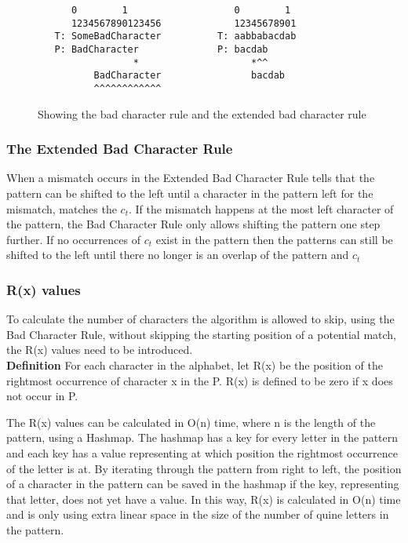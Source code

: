 \begin{figure}
\begin{verbatim}
      0        1                   0        1      
      1234567890123456             12345678901
   T: SomeBadCharacter          T: aabbabacdab
   P: BadCharacter              P: bacdab          
                 *                    *^^
          BadCharacter                bacdab
          ^^^^^^^^^^^^                
\end{verbatim}
    \caption{Showing the bad character rule and the extended bad character rule}
    \label{fig:badcharacterrule_example}
\end{figure}

\subsubsection{The Extended Bad Character Rule}
When a mismatch occurs in the Extended Bad Character Rule tells that the pattern can be shifted to the left until a character in the pattern left for the mismatch, matches the $c_t$. If the mismatch happens at the most left character of the pattern, the Bad Character Rule only allows shifting the pattern one step further.  If no occurrences of $c_t$ exist in the pattern then the patterns can still be shifted to the left until there no longer is an overlap of the pattern and $c_t$


\subsubsection{R(x) values}
To calculate the number of characters the algorithm is allowed to skip, using the Bad Character Rule, without skipping the starting position of a potential match, the R(x) values need to be introduced.\\

\textbf{Definition} For each character in the alphabet, let R(x) be the position of the rightmost occurrence of character x in the P. R(x) is defined to be zero if x does not occur in P.
 
The R(x) values can be calculated in O(n) time, where n is the length of the pattern, using a Hashmap. The hashmap has a key for every letter in the pattern and each key has a value representing at which position the rightmost occurrence of the letter is at. By iterating through the pattern from right to left, the position of a character in the pattern can be saved in the hashmap if the key, representing that letter, does not yet have a value. In this way, R(x) is calculated in O(n) time and is only using extra  linear space in the size of the number of quine letters in the pattern.

